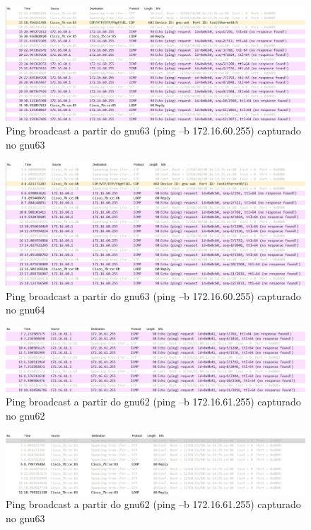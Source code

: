 \documentclass[article, a4paper, 11pt, oneside]{memoir}
\begin{document}
\begin{figure}[h]
	\centering
\includegraphics[scale=0.55]{exp2-step8-broadcast-gnu63-from-gnu63.png}
\caption{Ping broadcast a partir do gnu63 (ping –b 172.16.60.255) capturado no gnu63}
\end{figure}

\begin{figure}[h]
	\centering
\includegraphics[scale=0.55]{exp2-step8-broadcast-gnu63-from-gnu64.png}
\caption{Ping broadcast a partir do gnu63 (ping –b 172.16.60.255) capturado no gnu64}
\end{figure}

\newpage
\begin{figure}[h]
	\centering
\includegraphics[scale=0.55]{exp2-step10-broadcast-gnu62-from-gnu62.png}
\caption{Ping broadcast a partir do gnu62 (ping –b 172.16.61.255) capturado no gnu62}
\end{figure}

\begin{figure}[h]
	\centering
\includegraphics[scale=0.55]{exp2-step10-broadcast-gnu62-from-gnu63.png}
\caption{Ping broadcast a partir do gnu62 (ping –b 172.16.61.255) capturado no gnu63}
\end{figure}
\end{document}
